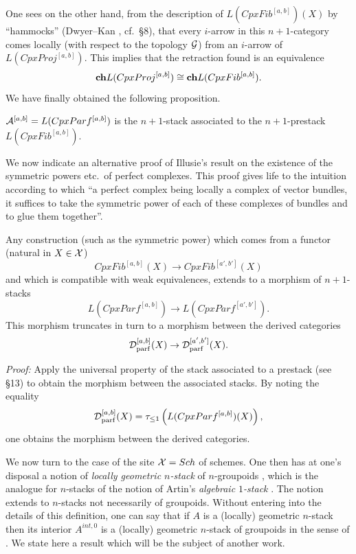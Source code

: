 One sees on the other hand, from the description of $L(CpxFib^{[a,b]})(X)$ by
``hammocks'' (Dwyer--Kan \cite{DwyerKan2}, cf.\ \S8), that every $i$-arrow in
this $n+1$-category comes locally (with respect to the topology
${\cal G}$) from an $i$-arrow of $L(CpxProj^{[a,b]})$. This implies that the
retraction found is an equivalence
$$
{\bf ch}L(CpxProj^{[a,b]}) \cong {\bf ch}L(CpxFib^{[a,b]}).
$$
We have finally obtained the following proposition.


\begin{proposition}
${\cal  A}^{[a,b]}=L(CpxParf^{[a,b]})$ is the $n+1$-stack associated to the
$n+1$-prestack $L(CpxFib^{[a,b]})$.
\end{proposition}
\eop

We now indicate an alternative proof of Illusie's result
\cite{Illusie}
on the existence of the symmetric powers etc.\ of perfect complexes. This
proof
gives life to the intuition according to which ``a perfect complex
being locally a
complex of vector bundles,
it suffices to take the symmetric power of each of these
complexes of bundles and to
glue them together''.

\begin{corollary}
Any construction (such
as the symmetric power) which comes from a functor
(natural in $X\in {\cal X}$)
$$
CpxFib^{[a,b]}(X) \rightarrow CpxFib^{[a',b']}(X)
$$
and which is compatible with weak equivalences,
extends to a morphism of $n+1$-stacks
$$
L(CpxParf^{[a,b]})\rightarrow L(CpxParf^{[a',b']}).
$$
This morphism truncates in turn to a morphism between the derived
categories
$$
{\cal D}^{[a,b]}_{\rm parf}(X)\rightarrow {\cal D}^{[a',b']}_{\rm parf}(X).
$$
\end{corollary}
{\em Proof:} Apply the universal property of the stack associated to a
prestack (see \S13) to obtain the morphism between the associated
stacks. By
noting the equality
$$
{\cal D}^{[a,b]}_{\rm parf}(X)=\tau _{\leq 1} \left(
L(CpxParf^{[a,b]})(X)\right) ,
$$
one obtains the morphism between the derived categories.
\eop



We now turn to the case of the site ${\cal X} = Sch$ of schemes.
One then has at one's disposal a notion of {\em locally geometric
$n$-stack} of
$n$-groupoids \cite{geometricN}, which is the analogue for
$n$-stacks of the
notion of Artin's {\em algebraic $1$-stack} \cite{ArtinInventiones}. The
notion extends to $n$-stacks not necessarily of groupoids. Without
entering into the details of this definition, one can say that if $A$ is
a (locally) geometric $n$-stack then its interior $A^{int,
0}$ is
a (locally) geometric $n$-stack of groupoids in the sense of
\cite{geometricN}. We state here a result which will be the subject of another
work.

